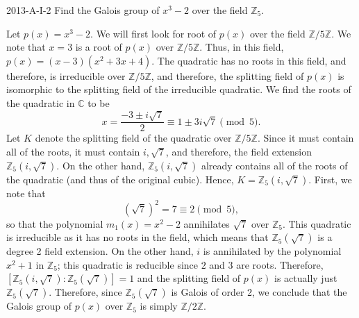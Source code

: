 \documentclass{article}
\begin{document}
	\begin{prb}{2013-A-I-2}
		Find the Galois group of $x^{3} - 2$ over the field $\mathbb{Z}_{5}$. 
	\end{prb}
	Let $p(x) = x^{3} -2$. We will first look for root of $p(x)$ over the field $\mathbb{Z}/5\mathbb{Z}$. We note that $x = 3$ is a root of $p(x)$ over $\mathbb{Z}/5\mathbb{Z}$. Thus, in this field, $p(x) = (x -3)(x^{2} + 3x + 4)$. The quadratic has no roots in this field, and therefore, is irreducible over $\mathbb{Z}/5\mathbb{Z}$, and therefore, the splitting field of $p(x)$ is isomorphic to the splitting field of the irreducible quadratic. We find the roots of the quadratic in $\mathbb{C}$ to be 
	\begin{equation*}
		x = \frac{-3 \pm i\sqrt{7}}{2} \equiv 1 \pm 3i\sqrt{7} \pmod{5}. 
	\end{equation*}
	Let $K$ denote the splitting field of the quadratic over $\mathbb{Z}/5\mathbb{Z}$. Since it must contain all of the roots, it must contain $i, \sqrt{7}$, and therefore, the field extension $\mathbb{Z}_{5}(i,\sqrt{7})$. On the other hand, $\mathbb{Z}_{5}(i,\sqrt{7})$ already contains all of the roots of the quadratic (and thus of the original cubic). Hence, $K = \mathbb{Z}_{5}(i,\sqrt{7})$. First, we note that 
	\begin{equation*}
		(\sqrt{7})^{2} = 7 \equiv 2 \pmod{5}, 
	\end{equation*}
	so that the polynomial $m_{1}(x) = x^{2} - 2$ annihilates $\sqrt{7}$ over $\mathbb{Z}_{5}$. This quadratic is irreducible as it has no roots in the field, which means that $\mathbb{Z}_{5}(\sqrt{7})$ is a degree 2 field extension. On the other hand, $i$ is annihilated by the polynomial $x^{2} + 1$ in $\mathbb{Z}_{5}$; this quadratic is reducible since $2$ and $3$ are roots. Therefore, $[\mathbb{Z}_{5}(i, \sqrt{7}):\mathbb{Z}_{5}(\sqrt{7})] = 1$ and the splitting field of $p(x)$ is actually just $\mathbb{Z}_{5}(\sqrt{7})$. Therefore, since $\mathbb{Z}_{5}(\sqrt{7})$ is Galois of order 2, we conclude that the Galois group of $p(x)$ over $\mathbb{Z}_{5}$ is simply $\mathbb{Z}/2\mathbb{Z}$. 
	
\end{document}
